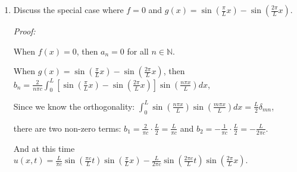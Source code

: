 \documentclass[letterpaper,12pt]{article}
\begin{document}
\begin{enumerate}[Q(1)]
\begin{enumerate}
    \item Discuss the special case where \( f = 0 \) and \( g(x) = \sin \left( \frac{\pi}{L} x \right) - \sin \left( \frac{2\pi}{L} x \right) \).

\textit{Proof:}  

When $f(x)=0$, then $a_n=0$ for all  $n\in \mathbb{N}$.

When \( g(x) = \sin \left( \frac{\pi}{L} x \right) - \sin \left( \frac{2\pi}{L} x \right) \), then $b_n = \frac{2}{n \pi c}\int_0^L [\sin \left( \frac{\pi}{L} x \right) - \sin \left( \frac{2\pi}{L} x \right) ] \sin(\frac{n\pi x}{L})dx$, 

Since we know the orthogonality: $\int_0^L \sin(\frac{n\pi x}{L})\sin(\frac{m\pi x}{L})dx=\frac{L}{2} \delta_{mn}$,

there are two non-zero terms: $b_1 = \frac{2}{\pi c} \cdot \frac{L}{2}=\frac{L}{\pi c} $ and $b_2 =- \frac{1}{\pi c} \cdot \frac{L}{2}=-\frac{L}{2\pi c}$.

And at this time $u(x,t)=\frac{L}{\pi c}\sin(\frac{\pi c}{L}t)\sin(\frac{\pi}{L}x)-\frac{L}{2\pi c}\sin(\frac{2\pi c}{L}t)\sin(\frac{2\pi}{L}x)$.
\end{enumerate}

  
\end{enumerate}
\end{document}
